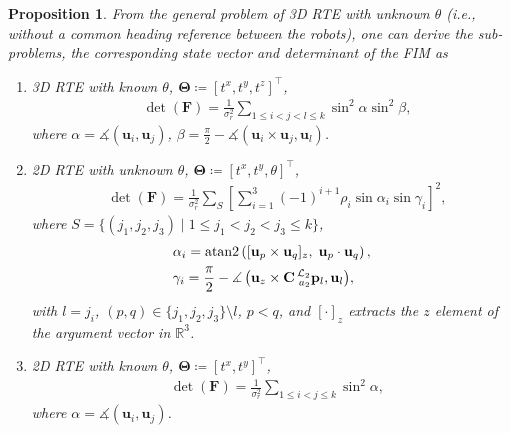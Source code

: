 \documentclass[journal]{IEEEtran}
\newtheorem{prop}{Proposition}[section]
\def\AlignedPosTarg{\mathbf{C} \prescript{\mathcal{L}_2}{a_2}{\mathbf{p}}} %
\def\StateVector{\mathbf{\Theta}}
\def\FIM{\mathbf{F}}
\def\UnitZ{\mathbf{u}_z}
\DeclareMathOperator{\atantwo}{atan2}
\begin{document}
\begin{prop} \label{prop:sub_prob}
From the general problem of 3D RTE with unknown $\theta$ (i.e., without a common heading reference between the robots), one can derive the sub-problems, the corresponding state vector and determinant of the FIM as
\begin{enumerate}[label=(\arabic*)]

    \item 3D RTE with known $\theta$, $\StateVector \coloneqq [t^x, t^y, t^z]^\top$,
    \begin{equation}
    \begin{aligned}
        &\det(\FIM) = 
        \frac{1}{\sigma_r^2} 
        \sum\limits_{1 \leq i < j < l \leq k}^{}
        \sin^2{\alpha} 
        \sin^2{\beta},
    \end{aligned}
    \end{equation}
    where $\alpha = \measuredangle (\mathbf{u}_i, \mathbf{u}_j)$, $\beta= \frac{\pi}{2} - \measuredangle (\mathbf{u}_i \times \mathbf{u}_j, \mathbf{u}_l)$.
    \item 2D RTE with unknown $\theta$, $\StateVector \coloneqq [t^x, t^y, \theta]^\top$,
    \begin{equation}
    \begin{aligned}
        &\det(\FIM) = 
        \frac{1}{\sigma_r^2} \sum\limits_S^{}
        \left[
        \sum\limits_{i=1}^{3}
        (-1)^{i+1}
        \rho_i
        \sin{\alpha_i}
        \sin{\gamma_i}
        \right]^2,
    \end{aligned}
    \end{equation}
    where $S = \{(j_1,j_2,j_3) \; \vert \;  1 \leq j_1 < j_2 < j_3 \leq k \}$,
    \begin{equation*}
    \begin{aligned}
        &\alpha_i = \atantwo 
        \left(
        [\mathbf{u}_p \times \mathbf{u}_q]_z, \;
        \mathbf{u}_p \cdot \mathbf{u}_q
        \right),\\
        &{\gamma_i = \frac{\pi}{2} - \measuredangle 
        \left(
        \UnitZ \times \AlignedPosTarg_l, \mathbf{u}_l
        \right)}, 
    \end{aligned}
    \end{equation*}
    with ${l=j_i}$, $(p,q) \in \{j_1,j_2,j_3\} \setminus l$, $p < q$, and $[\cdot]_z$ extracts the $z$ element of the argument vector in $\mathbb{R}^3$.
    \item \label{case:2D_known_theta} 2D RTE with known $\theta$, $\StateVector \coloneqq [t^x, t^y]^\top$,
    \begin{equation}
    \begin{aligned}
        &\det(\FIM) = 
        \frac{1}{\sigma_r^2} 
        \sum\limits_{ 1 \leq i < j \leq k}^{}
        \sin^2{\alpha},
    \end{aligned}
    \end{equation}
    where $\alpha = \measuredangle (\mathbf{u}_i,\mathbf{u}_j)$.
\end{enumerate}
\end{prop}
\end{document}
